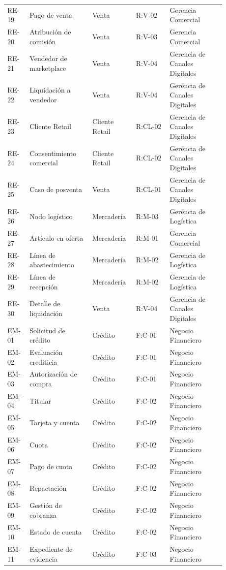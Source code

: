 \documentclass[11pt]{article}
\begin{document}
\begin{longtable}{@{}p{0.090\linewidth}p{0.269\linewidth}p{0.143\linewidth}p{0.143\linewidth}p{0.233\linewidth}@{}}
RE-19 & Pago de venta & Venta & R:V-02 & Gerencia Comercial \\
RE-20 & Atribución de comisión & Venta & R:V-03 & Gerencia Comercial \\
RE-21 & Vendedor de marketplace & Venta & R:V-04 & Gerencia de Canales Digitales \\
RE-22 & Liquidación a vendedor & Venta & R:V-04 & Gerencia de Canales Digitales \\
RE-23 & Cliente Retail & Cliente Retail & R:CL-02 & Gerencia de Canales Digitales \\
RE-24 & Consentimiento comercial & Cliente Retail & R:CL-02 & Gerencia de Canales Digitales \\
RE-25 & Caso de posventa & Venta & R:CL-01 & Gerencia de Canales Digitales \\
RE-26 & Nodo logístico & Mercadería & R:M-03 & Gerencia de Logística \\
RE-27 & Artículo en oferta & Mercadería & R:M-01 & Gerencia Comercial \\
RE-28 & Línea de abastecimiento & Mercadería & R:M-02 & Gerencia de Logística \\
RE-29 & Línea de recepción & Mercadería & R:M-02 & Gerencia de Logística \\
RE-30 & Detalle de liquidación & Venta & R:V-04 & Gerencia de Canales Digitales \\
EM-01 & Solicitud de crédito & Crédito & F:C-01 & Negocio Financiero \\
EM-02 & Evaluación crediticia & Crédito & F:C-01 & Negocio Financiero \\
EM-03 & Autorización de compra & Crédito & F:C-01 & Negocio Financiero \\
EM-04 & Titular & Crédito & F:C-02 & Negocio Financiero \\
EM-05 & Tarjeta y cuenta & Crédito & F:C-02 & Negocio Financiero \\
EM-06 & Cuota & Crédito & F:C-02 & Negocio Financiero \\
EM-07 & Pago de cuota & Crédito & F:C-02 & Negocio Financiero \\
EM-08 & Repactación & Crédito & F:C-02 & Negocio Financiero \\
EM-09 & Gestión de cobranza & Crédito & F:C-02 & Negocio Financiero \\
EM-10 & Estado de cuenta & Crédito & F:C-02 & Negocio Financiero \\
EM-11 & Expediente de evidencia & Crédito & F:C-03 & Negocio Financiero \\

\end{longtable}
\end{document}
